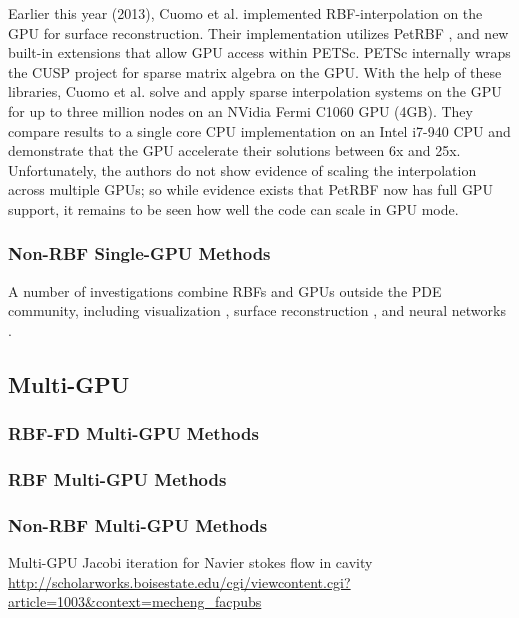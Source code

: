 \documentclass[11pt]{report}
\begin{document}
Earlier this year (2013), Cuomo et al. \cite{Cuomo2013} implemented RBF-interpolation on the GPU for surface reconstruction. Their implementation utilizes PetRBF \cite{Yokota2010}, and new built-in extensions that allow GPU access within PETSc. PETSc internally wraps the CUSP project \cite{Cusp2012} for sparse matrix algebra on the GPU. With the help of these libraries, Cuomo et al. solve and apply sparse interpolation systems on the GPU for up to three million nodes on an NVidia Fermi C1060 GPU (4GB). They compare results to a single core CPU implementation on an Intel i7-940 CPU and demonstrate that the GPU accelerate their solutions between 6x and 25x. Unfortunately, the authors do not show evidence of scaling the interpolation across multiple GPUs; so while evidence exists that PetRBF now has full GPU support, it remains to be seen how well the code can scale in GPU mode. 


\subsubsection{Non-RBF Single-GPU Methods}


A number of investigations combine RBFs and GPUs outside the PDE community, including visualization \cite{Cuntz2007,Weiler2005},  surface reconstruction \cite{Corrigan2005,Carr2003}, and neural networks \cite{Brandstetter2008}.



\subsection{Multi-GPU}

\subsubsection{RBF-FD Multi-GPU Methods} 

\subsubsection{RBF Multi-GPU Methods}
 
\subsubsection{Non-RBF Multi-GPU Methods}
 
Multi-GPU Jacobi iteration for Navier stokes flow in cavity \url{http://scholarworks.boisestate.edu/cgi/viewcontent.cgi?article=1003&context=mecheng_facpubs}
\end{document}
